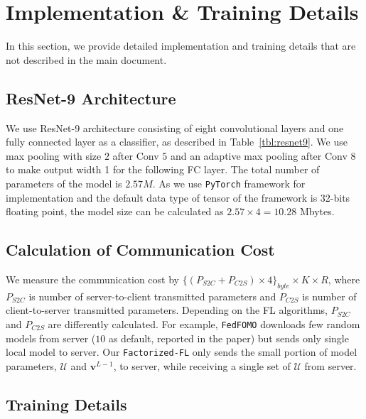 \section{Implementation \& Training Details} 
\label{appdx:details}
In this section, we provide detailed implementation and training details that are not described in the main document.

\subsection{ResNet-9 Architecture}


We use ResNet-9 architecture consisting of eight convolutional layers and one fully connected layer as a classifier, as described in Table~\ref{tbl:resnet9}. We use max pooling with size $2$ after Conv $5$ and an adaptive max pooling after Conv $8$ to make output width 1 for the following FC layer. The total number of parameters of the model is $2.57 M$. As we use \texttt{PyTorch} framework for implementation and the default data type of tensor of the framework is 32-bits floating point, the model size can be calculated as $2.57 \times 4 = 10.28$ Mbytes. 




\subsection{Calculation of Communication Cost}
We measure the communication cost by $\{(P_{S2C}+P_{C2S}) \times 4 \}_{byte} \times K \times R$, where $P_{S2C}$ is number of server-to-client transmitted parameters and $P_{C2S}$ is number of client-to-server transmitted parameters. Depending on the FL algorithms, $P_{S2C}$ and  $P_{C2S}$ are differently calculated. For example, \texttt{FedFOMO} downloads few random models from server ($10$ as default, reported in the paper) but sends only single local model to server. Our \texttt{Factorized-FL} only sends the  small portion of model parameters, $\mathcal{U}$ and $\textbf{v}^{L-1}$, to server, while receiving a single set of $\mathcal{U}$ from server. 

\subsection{Training Details}

